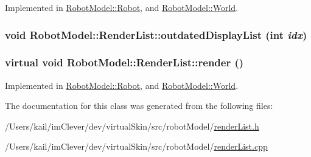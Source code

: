 Implemented in \hyperlink{class_robot_model_1_1_robot_af9d5c7808f2d11ec66d905bb8606447e}{RobotModel::Robot}, and \hyperlink{class_robot_model_1_1_world_a2300046adaa75a432476dbef1934bb01}{RobotModel::World}.\hypertarget{class_robot_model_1_1_render_list_a22724d5d6878f19b639b5b6b16963ee2}{
\subsubsection[{outdatedDisplayList}]{\setlength{\rightskip}{0pt plus 5cm}void RobotModel::RenderList::outdatedDisplayList (int {\em idx})}}
\label{class_robot_model_1_1_render_list_a22724d5d6878f19b639b5b6b16963ee2}
\hypertarget{class_robot_model_1_1_render_list_ac8646765beee22bf11582049dc3cf195}{
\subsubsection[{render}]{\setlength{\rightskip}{0pt plus 5cm}virtual void RobotModel::RenderList::render ()}}
\label{class_robot_model_1_1_render_list_ac8646765beee22bf11582049dc3cf195}


Implemented in \hyperlink{class_robot_model_1_1_robot_a47e480a4cad58266d12efce34f3fb563}{RobotModel::Robot}, and \hyperlink{class_robot_model_1_1_world_a150eab10c21532162bb698d72aecec16}{RobotModel::World}.

The documentation for this class was generated from the following files:\begin{DoxyCompactItemize}
\item 
/Users/kail/imClever/dev/virtualSkin/src/robotModel/\hyperlink{render_list_8h}{renderList.h}\item 
/Users/kail/imClever/dev/virtualSkin/src/robotModel/\hyperlink{render_list_8cpp}{renderList.cpp}\end{DoxyCompactItemize}
